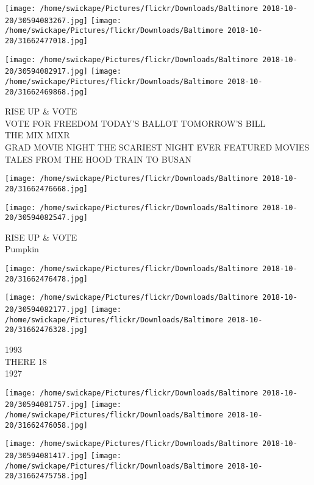 \documentclass[10pt,letterpaper]{article}
\begin{document}
\texttt{[image: /home/swickape/Pictures/flickr/Downloads/Baltimore 2018-10-20/30594083267.jpg]}
\texttt{[image: /home/swickape/Pictures/flickr/Downloads/Baltimore 2018-10-20/31662477018.jpg]}

\texttt{[image: /home/swickape/Pictures/flickr/Downloads/Baltimore 2018-10-20/30594082917.jpg]}
\texttt{[image: /home/swickape/Pictures/flickr/Downloads/Baltimore 2018-10-20/31662469868.jpg]}

RISE UP \& VOTE\\
VOTE FOR FREEDOM TODAY'S BALLOT TOMORROW'S BILL\\
THE MIX MIXR\\
GRAD MOVIE NIGHT THE SCARIEST NIGHT EVER FEATURED MOVIES TALES FROM THE HOOD TRAIN TO BUSAN\\
\pagebreak

\texttt{[image: /home/swickape/Pictures/flickr/Downloads/Baltimore 2018-10-20/31662476668.jpg]}

\vspace{0.25in}
\texttt{[image: /home/swickape/Pictures/flickr/Downloads/Baltimore 2018-10-20/30594082547.jpg]}

RISE UP \& VOTE\\
Pumpkin\\
\pagebreak

\texttt{[image: /home/swickape/Pictures/flickr/Downloads/Baltimore 2018-10-20/31662476478.jpg]}

\vspace{0.25in}
\texttt{[image: /home/swickape/Pictures/flickr/Downloads/Baltimore 2018-10-20/30594082177.jpg]}
\texttt{[image: /home/swickape/Pictures/flickr/Downloads/Baltimore 2018-10-20/31662476328.jpg]}

1993\\
THERE 18\\
1927\\
\pagebreak

\texttt{[image: /home/swickape/Pictures/flickr/Downloads/Baltimore 2018-10-20/30594081757.jpg]}
\texttt{[image: /home/swickape/Pictures/flickr/Downloads/Baltimore 2018-10-20/31662476058.jpg]}

\texttt{[image: /home/swickape/Pictures/flickr/Downloads/Baltimore 2018-10-20/30594081417.jpg]}
\texttt{[image: /home/swickape/Pictures/flickr/Downloads/Baltimore 2018-10-20/31662475758.jpg]}
\end{document}
